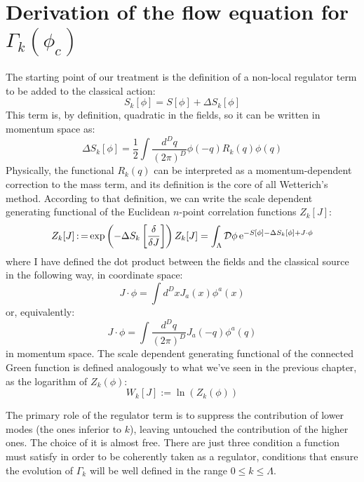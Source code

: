 \section{Derivation of the flow equation for $\Gamma_k(\phi_c)$}
The starting point of our treatment is the definition of a non-local regulator term to be added to the classical action:
\begin{equation}
 S_k[\phi] = S[\phi] + \Delta S_k[\phi]
\end{equation}
This term is, by definition,  quadratic in the fields, so it can be written in momentum space as:
\begin{equation}\label{essekappa}
 \Delta S_k[\phi] = \frac{1}{2} \int \frac{d^D q}{(2\pi)^D} \phi(-q)R_k(q)\phi(q)
\end{equation}
Physically, the functional $R_k(q)$ can be interpreted as a momentum-dependent correction to the mass term, and its definition
is the core of all Wetterich's method. According to that definition, we can write the scale dependent generating functional of the Euclidean $n$-point correlation functions $Z_k[J]$:
\begin{equation}\label{wdoppio}
 Z_k[J] \operatorname{:=} \exp \left( -\Delta S_k\left[\frac{\delta}{\delta J}\right] \right) Z_k[J] = \int_{\Lambda} \mathcal{D}\phi \operatorname{e}^{-S[\phi] -\Delta S_k[\phi] + J\cdot\phi}
\end{equation}
where I have defined the dot product between the fields and the classical source in the following way, in coordinate space:
\begin{equation}
 J\cdot\phi = \int d^Dx J_a (x)\phi^a(x)
\end{equation}
or, equivalently:
\begin{equation}
  J\cdot\phi = \int \frac{d^Dq}{(2\pi)^D} J_a (-q)\phi^a(q)
\end{equation}
in momentum space. The scale dependent generating functional of the connected Green function is defined analogously to what 
we've seen in the previous chapter, as the logarithm of $Z_k(\phi)$:
\begin{equation}\label{defW}
 W_k[J] := \ln(Z_k(\phi))
\end{equation}

The primary role of the regulator term is to suppress the contribution of lower modes (the ones inferior to $k$), 
leaving untouched the contribution of the higher ones. The choice of it is almost free. There are just three condition a function must satisfy in order to be coherently
taken as a regulator, conditions that ensure the evolution of $\Gamma_k$ will be well defined in the range $0\leq k\leq\Lambda$. 

